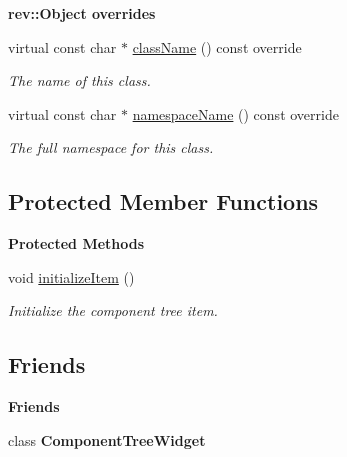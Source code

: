 \begin{Indent}\textbf{ rev\+::Object overrides}\par
\begin{DoxyCompactItemize}
\item 
virtual const char $\ast$ \mbox{\hyperlink{classrev_1_1_view_1_1_component_blueprint_item_a735f5d6800e98b51ec826fd4ca05dd91}{class\+Name}} () const override
\begin{DoxyCompactList}\small\item\em The name of this class. \end{DoxyCompactList}\item 
virtual const char $\ast$ \mbox{\hyperlink{classrev_1_1_view_1_1_component_blueprint_item_a0b0ed2cacce8cc3e1d7cc7ac14ca3c6f}{namespace\+Name}} () const override
\begin{DoxyCompactList}\small\item\em The full namespace for this class. \end{DoxyCompactList}\end{DoxyCompactItemize}
\end{Indent}
\subsection*{Protected Member Functions}
\begin{Indent}\textbf{ Protected Methods}\par
\begin{DoxyCompactItemize}
\item 
\mbox{\label{classrev_1_1_view_1_1_component_blueprint_item_ab62105ac228d6a0e1b1b8b227206940e}} 
void \mbox{\hyperlink{classrev_1_1_view_1_1_component_blueprint_item_ab62105ac228d6a0e1b1b8b227206940e}{initialize\+Item}} ()
\begin{DoxyCompactList}\small\item\em Initialize the component tree item. \end{DoxyCompactList}\end{DoxyCompactItemize}
\end{Indent}
\subsection*{Friends}
\begin{Indent}\textbf{ Friends}\par
\begin{DoxyCompactItemize}
\item 
\mbox{\label{classrev_1_1_view_1_1_component_blueprint_item_a350b4d2b555fb1075041d366ade3f718}} 
class {\bfseries Component\+Tree\+Widget}
\end{DoxyCompactItemize}
\end{Indent}
